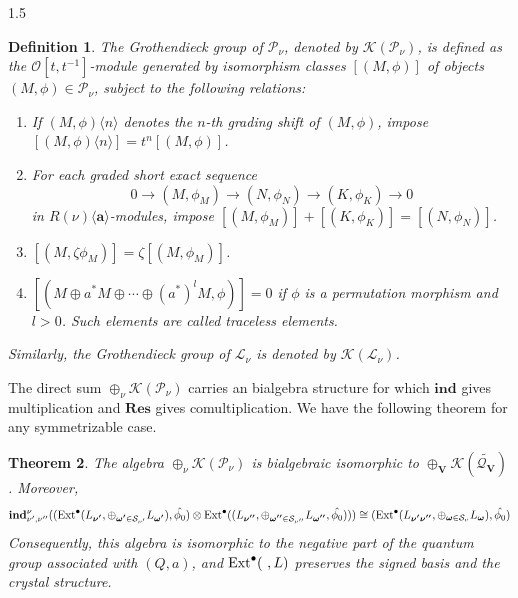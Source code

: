 \documentclass[10pt]{amsart}
\newtheorem{theorem}{Theorem}[section]
\newtheorem{definition}[theorem]{Definition}
\def\Ext{\mbox{\rm Ext}}   \def\Ker{\mbox{\rm Ker}\,}
\def\bfV{{\mathbf V}}
\def\bfV{\mathbf{V}}
\def\Res{\mathbf{Res}}
\def\ind{\mathbf{ind}}
\newcommand\mk{{\mathcal{K}}}
\newcommand\mq{{\mathcal{Q}}}
\begin{document}
\begin{spacing}{1.5}
\begin{definition}
The Grothendieck group of $\mathcal{P}_{\nu}$, denoted by $\mathcal{K}(\mathcal{P}_{\nu})$, is defined as the $\mathcal{O}[t, t^{-1}]$-module generated by isomorphism classes $[(M,\phi)]$ of objects $(M,\phi)\in \mathcal{P}_{\nu}$, subject to the following relations:
\begin{enumerate}
    \item If $(M,\phi)\langle n\rangle$ denotes the $n$-th grading shift of $(M,\phi)$, impose $[(M,\phi)\langle n\rangle] = t^{n}[(M,\phi)]$.
    \item For each graded short exact sequence
    \[
    0 \to (M,\phi_M) \to (N,\phi_N) \to (K,\phi_K) \to 0
    \]
    in $R(\nu)\langle\mathbf{a}\rangle$-modules, impose $[(M,\phi_M)] + [(K,\phi_K)] = [(N,\phi_N)]$.
    \item $[(M,\zeta \phi_M)] = \zeta [(M,\phi_M)]$.
    \item $[(M \oplus a^* M \oplus \cdots \oplus (a^*)^l M, \phi)] = 0$ if $\phi$ is a permutation morphism and $l > 0$. Such elements are called traceless elements.
\end{enumerate}
Similarly, the Grothendieck group of $\mathcal{L}_{\nu}$ is denoted by $\mathcal{K}(\mathcal{L}_{\nu})$.
\end{definition}

The direct sum $\oplus_{\nu}\mathcal{K}(\mathcal{P}_{\nu})$ carries an bialgebra structure for which $\ind$ gives multiplication and $\Res$ gives comultiplication.
We have the following theorem for any symmetrizable case.

\begin{theorem}
The algebra $\oplus_{\nu}\mathcal{K}(\mathcal{P}_{\nu})$ is bialgebraic isomorphic to $\oplus_{\bfV}\mk(\widetilde{\mq_{\bfV}})$ \cite[Chapter 12]{lusztig2010introduction}. Moreover,
\[
\ind_{\nu',\nu''}^{\nu}((\Ext^{\bullet}(L_{\boldsymbol{\nu'}},\oplus_{\boldsymbol{\omega'}\in \mathcal{S}_{\nu'}}L_{\boldsymbol{\omega'}}),\hat{\phi_0})\otimes \Ext^{\bullet}((L_{\boldsymbol{\nu''}},\oplus_{\boldsymbol{\omega''}\in \mathcal{S}_{\nu''}}L_{\boldsymbol{\omega''}},\hat{\phi_0})))\cong (\Ext^{\bullet}(L_{\boldsymbol{\nu'\nu''}},\oplus_{\boldsymbol{\omega}\in \mathcal{S}_{\nu}}L_{\boldsymbol{\omega}}),\hat{\phi_0})
\]
Consequently, this algebra is isomorphic to the negative part of the quantum group associated with $(Q,a)$, and $\Ext^{\bullet}(\ ,L)$ preserves the signed basis and the crystal structure.


\end{theorem}
\end{spacing}
\end{document}
